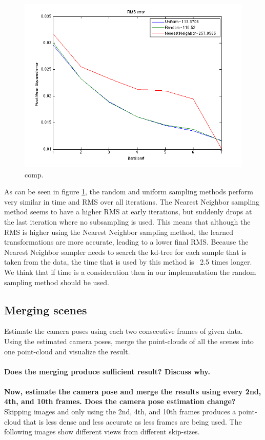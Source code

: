 \documentclass[12pt]{amsart}
\begin{document}
\begin{figure}[H]
\center
\includegraphics[scale=0.5]{images/comparison.png}
\caption{comp.}
\label{comp}
\end{figure}

As can be seen in figure \ref{comp}, the random and uniform sampling methods perform very similar in time and RMS over all iterations. The Nearest Neighbor sampling method seems to have a higher RMS at early iterations, but suddenly drops at the last iteration where no subsampling is used. This means that although the RMS is higher using the Nearest Neighbor sampling method, the learned transformations are more accurate, leading to a lower final RMS. Because the Nearest Neighbor sampler needs to search the kd-tree for each sample that is taken from the data, the time that is used by this method is ~2.5 times longer. We think that if time is a consideration then in our implementation the random sampling method should be used.


\subsection{Merging scenes}
Estimate the camera poses using each two consecutive frames of given data. Using the estimated camera poses, merge the point-clouds of all the scenes into one point-cloud and visualize the result. 
\\\\
\textbf{Does the merging produce sufficient result? Discuss why.}
\\\\
\textbf{Now, estimate the camera pose and merge the results using every 2nd, 4th, and 10th frames. Does the camera pose estimation change?}\\
Skipping images and only using the 2nd, 4th, and 10th frames produces a point-cloud that is less dense and less accurate as less frames are being used. The following images show different views from different skip-sizes.\\\\
\end{document}
